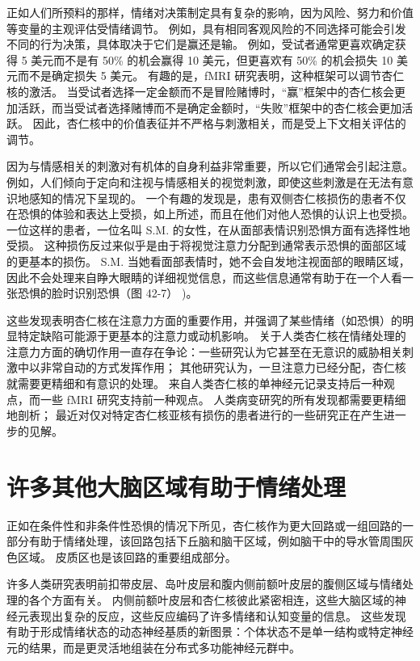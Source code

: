 正如人们所预料的那样，情绪对决策制定具有复杂的影响，因为风险、努力和价值等变量的主观评估受情绪调节。 例如，具有相同客观风险的不同选择可能会引发不同的行为决策，具体取决于它们是赢还是输。 例如，受试者通常更喜欢确定获得 5 美元而不是有 50\% 的机会赢得 10 美元，但更喜欢有 50\% 的机会损失 10 美元而不是确定损失 5 美元。 有趣的是，fMRI 研究表明，这种框架可以调节杏仁核的激活。 当受试者选择一定金额而不是冒险赌博时，“赢”框架中的杏仁核会更加活跃，而当受试者选择赌博而不是确定金额时，“失败”框架中的杏仁核会更加活跃。 因此，杏仁核中的价值表征并不严格与刺激相关，而是受上下文相关评估的调节。

因为与情感相关的刺激对有机体的自身利益非常重要，所以它们通常会引起注意。 例如，人们倾向于定向和注视与情感相关的视觉刺激，即使这些刺激是在无法有意识地感知的情况下呈现的。 一个有趣的发现是，患有双侧杏仁核损伤的患者不仅在恐惧的体验和表达上受损，如上所述，而且在他们对他人恐惧的认识上也受损。 一位这样的患者，一位名叫 S.M. 的女性，在从面部表情识别恐惧方面有选择性地受损。 这种损伤反过来似乎是由于将视觉注意力分配到通常表示恐惧的面部区域的更基本的损伤。 S.M. 当她看面部表情时，她不会自发地注视面部的眼睛区域，因此不会处理来自睁大眼睛的详细视觉信息，而这些信息通常有助于在一个人看一张恐惧的脸时识别恐惧（图 42-7） )。

这些发现表明杏仁核在注意力方面的重要作用，并强调了某些情绪（如恐惧）的明显特定缺陷可能源于更基本的注意力或动机影响。 关于人类杏仁核在情绪处理的注意力方面的确切作用一直存在争论：一些研究认为它甚至在无意识的威胁相关刺激中以非常自动的方式发挥作用； 其他研究认为，一旦注意力已经分配，杏仁核就需要更精细和有意识的处理。 来自人类杏仁核的单神经元记录支持后一种观点，而一些 fMRI 研究支持前一种观点。 人类病变研究的所有发现都需要更精细地剖析； 最近对仅对特定杏仁核亚核有损伤的患者进行的一些研究正在产生进一步的见解。


\section{许多其他大脑区域有助于情绪处理}
正如在条件性和非条件性恐惧的情况下所见，杏仁核作为更大回路或一组回路的一部分有助于情绪处理，该回路包括下丘脑和脑干区域，例如脑干中的导水管周围灰色区域。 皮质区也是该回路的重要组成部分。

许多人类研究表明前扣带皮层、岛叶皮层和腹内侧前额叶皮层的腹侧区域与情绪处理的各个方面有关。 内侧前额叶皮层和杏仁核彼此紧密相连，这些大脑区域的神经元表现出复杂的反应，这些反应编码了许多情绪和认知变量的信息。 这些发现有助于形成情绪状态的动态神经基质的新图景：个体状态不是单一结构或特定神经元的结果，而是更灵活地组装在分布式多功能神经元群中。

